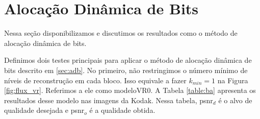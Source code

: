 \section{Alocação Dinâmica de Bits}

Nessa seção disponibilizamos e discutimos os resultados como o método de alocação dinâmica de bits. 

Definimos dois testes principais para aplicar o método de alocação dinâmica de bits descrito em \ref{sec:adb}. No primeiro, não restringimos o número mínimo de níveis de reconstrução em cada bloco. Isso equivale a fazer $k_{min} = 1$ na Figura \ref{fig:flux_vr}. Referimos  a ele como modeloVR0.  A Tabela \ref{table:ba} apresenta os resultados desse modelo nas imagens da Kodak. Nessa tabela, \acrshort{psnr}$_d$ é o alvo de qualidade desejada e \acrshort{psnr}$_o$ é a qualidade obtida. 



